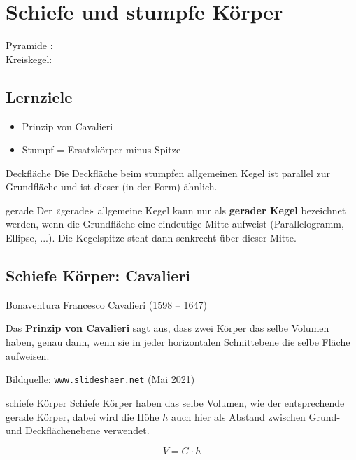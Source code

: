 \section{Schiefe und stumpfe Körper}

Pyramide : \\
Kreiskegel: \\

\subsection*{Lernziele}
\begin{itemize}
\item Prinzip von Cavalieri
\item Stumpf = Ersatzkörper minus Spitze
\end{itemize}


\begin{bemerkung}{Deckfläche}{}
Die Deckfläche beim stumpfen allgemeinen Kegel ist parallel zur
Grundfläche und ist dieser (in der Form) ähnlich.
\end{bemerkung}

\begin{bemerkung}{gerade}{}
  Der «gerade» allgemeine Kegel kann nur als \textbf{gerader Kegel}
  bezeichnet werden, wenn die Grundfläche eine eindeutige Mitte
  aufweist (Parallelogramm, Ellipse, ...). Die Kegelspitze steht dann senkrecht über dieser Mitte.
\end{bemerkung}
  \newpage


\subsection{Schiefe Körper: Cavalieri}
Bonaventura Francesco Cavalieri (1598 – 1647)

Das \textbf{Prinzip von Cavalieri} sagt aus, dass zwei Körper das
selbe Volumen haben, genau dann, wenn sie in jeder horizontalen
Schnittebene die selbe Fläche aufweisen.

Bildquelle: \texttt{www.slideshaer.net} (Mai 2021)
\vspace{9mm}

\begin{gesetz}{schiefe Körper}{}
  Schiefe Körper haben das selbe Volumen, wie der entsprechende gerade Körper, dabei wird die Höhe $h$ auch hier als Abstand zwischen Grund- und Deckflächenebene verwendet.

  $$V = G\cdot{} h$$
\end{gesetz}

